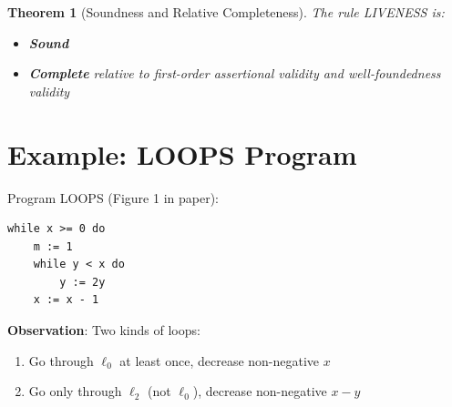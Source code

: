 \documentclass{article}
\newtheorem{theorem}{Theorem}
\begin{document}
\begin{figure}[h]
\centering
{}
\end{figure}

\begin{theorem}[Soundness and Relative Completeness]
The rule LIVENESS is:
\begin{itemize}
    \item \textbf{Sound}
    \item \textbf{Complete} relative to first-order assertional validity and well-foundedness validity
\end{itemize}
\end{theorem}

\section{Example: LOOPS Program}

Program LOOPS (Figure 1 in paper):
\begin{verbatim}
while x >= 0 do
    m := 1
    while y < x do
        y := 2y
    x := x - 1
\end{verbatim}

\textbf{Observation}: Two kinds of loops:
\begin{enumerate}
    \item Go through $\ell_0$ at least once, decrease non-negative $x$
    \item Go only through $\ell_2$ (not $\ell_0$), decrease non-negative $x - y$
\end{enumerate}
\end{document}
